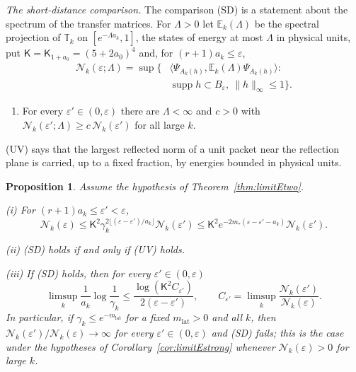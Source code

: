 \documentclass[aps,prd,twocolumn,superscriptaddress,nofootinbib,longbibliography,floatfix,amsmath,amssymb,10pt]{revtex4-2}
\newtheorem{proposition}[theorem]{Proposition}
\theoremstyle{definition}
\theoremstyle{remark}
\newcommand{\ip}[2]{\langle #1,#2\rangle}
\begin{document}
\emph{The short-distance comparison.} The comparison (SD) is a statement
about the spectrum of the transfer matrices. For $\Lambda>0$ let
$\mathbb E_k(\Lambda)$ be the spectral projection of $\mathbb T_k$ on
$[e^{-\Lambda a_k},1]$, the states of energy at most $\Lambda$ in physical
units, put $\mathsf K=\mathsf K_{1+a_0}=(5+2a_0)^4$ and, for $(r+1)a_k\le
\varepsilon$,
\[
\begin{split}
\mathcal N_k(\varepsilon;\Lambda)=\sup\bigl\{&\ip{\Psi_{A_k(h)}}{\mathbb
E_k(\Lambda)\Psi_{A_k(h)}}:\\
&\operatorname{supp}h\subset B_\varepsilon,\ \|h\|_\infty\le1\bigr\}.
\end{split}
\]
\begin{enumerate}[label=\textup{(UV)},leftmargin=*]
\item For every $\varepsilon'\in(0,\varepsilon)$ there are $\Lambda<\infty$
and $c>0$ with $\mathcal N_k(\varepsilon';\Lambda)\ge c\,\mathcal
N_k(\varepsilon')$ for all large $k$.
\end{enumerate}
(UV) says that the largest reflected norm of a unit packet near the
reflection plane is carried, up to a fixed fraction, by energies bounded in
physical units.

\begin{proposition}\label{prop:limitEsd}
Assume the hypothesis of Theorem~\textup{\ref{thm:limitEtwo}}.

\textup{(i)} For $(r+1)a_k\le\varepsilon'<\varepsilon$,
\[
\mathcal N_k(\varepsilon)\le\mathsf K^2\gamma_k^{2\lfloor(\varepsilon-
\varepsilon')/a_k\rfloor}\mathcal N_k(\varepsilon')\le\mathsf K^2
e^{-2m_*(\varepsilon-\varepsilon'-a_k)}\mathcal N_k(\varepsilon') .
\]

\textup{(ii)} \textup{(SD)} holds if and only if \textup{(UV)} holds.

\textup{(iii)} If \textup{(SD)} holds, then for every $\varepsilon'\in(0,
\varepsilon)$
\[
\limsup_k\frac1{a_k}\log\frac1{\gamma_k}\le\frac{\log(\mathsf K^2
C_{\varepsilon'})}{2(\varepsilon-\varepsilon')},\qquad C_{\varepsilon'}=
\limsup_k\frac{\mathcal N_k(\varepsilon')}{\mathcal N_k(\varepsilon)} .
\]
In particular, if $\gamma_k\le e^{-m_{\mathrm{lat}}}$ for a fixed
$m_{\mathrm{lat}}>0$ and all $k$, then $\mathcal N_k(\varepsilon')/\mathcal
N_k(\varepsilon)\to\infty$ for every $\varepsilon'\in(0,\varepsilon)$ and
\textup{(SD)} fails; this is the case under the hypotheses of
Corollary~\textup{\ref{cor:limitEstrong}} whenever $\mathcal
N_k(\varepsilon)>0$ for large $k$.
\end{proposition}
\end{document}
